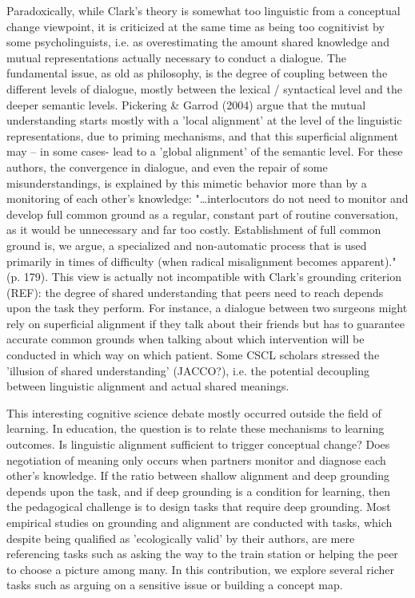\documentclass[twocolumn]{article}
\begin{document}
Paradoxically, while Clark's theory is somewhat too linguistic from a conceptual
change viewpoint, it is criticized at the same time as being too cognitivist by
some psycholinguists, i.e. as overestimating the amount shared knowledge and
mutual representations actually necessary to conduct a dialogue. The fundamental
issue, as old as philosophy, is the degree of coupling between the different
levels of dialogue, mostly between the lexical / syntactical level and the
deeper semantic levels. Pickering \& Garrod (2004) argue that the mutual
understanding starts mostly with a 'local alignment' at the level of the
linguistic representations, due to priming mechanisms, and that this superficial
alignment may – in some cases- lead to a 'global alignment' of the semantic
level.  For these authors, the convergence in dialogue, and even the repair of
some misunderstandings, is explained by this mimetic behavior more than by a
monitoring of each other's knowledge: "…interlocutors do not need to monitor and
develop full common ground as a regular, constant part of routine conversation,
as it would be unnecessary and far too costly. Establishment of full common
ground is, we argue, a specialized and non-automatic process that is used
primarily in times of difficulty (when radical misalignment becomes apparent)."
(p. 179). This view is actually not incompatible with Clark's grounding
criterion (REF): the degree of shared understanding that peers need to reach
depends upon the task they perform. For instance, a dialogue between two
surgeons might rely on superficial alignment if they talk about their friends
but has to guarantee accurate common grounds when talking about which
intervention will be conducted in which way on which patient.  Some CSCL
scholars stressed the 'illusion of shared understanding' (JACCO?), i.e. the
potential decoupling between linguistic alignment and actual shared meanings.

This interesting cognitive science debate mostly occurred outside the field of
learning. In education, the question is to relate these mechanisms to learning
outcomes. Is linguistic alignment sufficient to trigger conceptual change? Does
negotiation of meaning only occurs when partners monitor and diagnose each
other's knowledge. If the ratio between shallow alignment and deep grounding
depends upon the task, and if deep grounding is a condition for learning, then
the pedagogical challenge is to design tasks that require deep grounding. Most
empirical studies on grounding and alignment are conducted with tasks, which
despite being qualified as 'ecologically valid' by their authors, are mere
referencing tasks such as asking the way to the train station or helping the
peer to choose a picture among many. In this contribution, we explore several
richer tasks such as arguing on a sensitive issue or building a concept map.  
\end{document}

